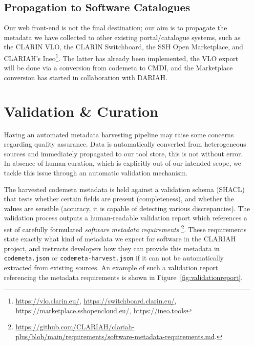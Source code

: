 \documentclass[a4paper,11pt]{article}
\begin{document}
\subsection{Propagation to Software Catalogues}

Our web front-end is not the final destination; our aim is to propagate the
metadata we have collected to other existing portal/catalogue systems, such as
the CLARIN VLO, the CLARIN Switchboard, the SSH Open Marketplace, and CLARIAH's
Ineo\footnote{\url{https://vlo.clarin.eu/},
\url{https://switchboard.clarin.eu/},
\url{https://marketplace.sshopencloud.eu/}, \url{https://ineo.tools}}. The
latter has already been implemented, the VLO export will be done via a conversion
from codemeta to CMDI, and the Marketplace conversion has started in collaboration with
DARIAH.



\section{Validation \& Curation}

Having an automated metadata harvesting pipeline may raise some concerns
regarding quality assurance. Data is automatically converted from heterogeneous
sources and immediately propagated to our tool store, this is not without
error. In absence of human curation, which is explicitly out of our intended
scope, we tackle this issue through an automatic validation mechanism.

The harvested codemeta metadata is held against a validation schema (SHACL)
that tests whether certain fields are present (completeness), and whether the
values are sensible (accuracy, it is capable of detecting various
discrepancies). The validation process outputs a human-readable validation
report which references a set of carefully formulated \emph{software metadata
requirements}
\footnote{\url{https://github.com/CLARIAH/clariah-plus/blob/main/requirements/software-metadata-requirements.md}.}.
These requirements state exactly what kind of metadata we expect for software
in the CLARIAH project, and instructs developers how they can provide this
metadata in \texttt{codemeta.json} or \texttt{codemeta-harvest.json} if it can
not be automatically extracted from existing sources. An example of such a
validation report referencing the metadata requirements is shown in
Figure~\ref{fig:validationreport}.
\end{document}
